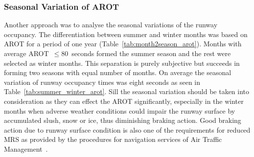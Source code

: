 \subsubsection{Seasonal Variation of AROT\label{sssec:seasonal_arot}}
Another approach was to analyse the seasonal variations of the runway occupancy. The differentiation between summer and winter months was based on AROT for a period of one year (Table~\ref{tab:month2season_arot}). Months with average AROT~$\leq$80~seconds formed the summer season and the rest were selected as winter months. This separation is purely subjective but succeeds in forming two seasons with equal number of months. On average the seasonal variation of runway occupancy times was eight seconds as seen in Table~\ref{tab:summer_winter_arot}. Sill the seasonal variation should be taken into consideration as they can effect the AROT significantly, especially in the winter months when adverse weather conditions could impair the runway surface by accumulated slush, snow or ice, thus diminishing braking action. Good braking action due to runway surface condition is also one of the requirements for reduced MRS as provided by the procedures for navigation services of Air Traffic Management~\cite{doc44444}.
\begin{table}[h]
\centering
{}
\caption[AROTs for the air traffic mix by season]{AROT statistics for the air traffic mix at KEF by season. The count is the number of landings in peak hours since October 2017}
\label{tab:summer_winter_arot}
\end{table}

